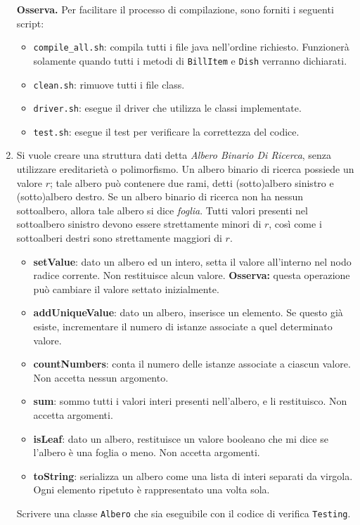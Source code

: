 \documentclass[]{scrartcl}
\begin{document}
\begin{enumerate}
\textbf{Osserva.} Per facilitare il processo di compilazione, sono forniti i seguenti script:
\begin{itemize}
	\item \texttt{compile\_all.sh}: compila tutti i file java nell'ordine richiesto. Funzionerà solamente quando tutti i metodi di \texttt{BillItem} e \texttt{Dish} verranno dichiarati.
	\item \texttt{clean.sh}: rimuove tutti i file class.
	\item \texttt{driver.sh}: esegue il driver che utilizza le classi implementate.
	\item \texttt{test.sh}: esegue il test per verificare la correttezza del codice.
\end{itemize}

\item Si vuole creare una struttura dati detta \textit{Albero Binario Di Ricerca}, senza utilizzare ereditarietà o polimorfismo. Un albero binario di ricerca possiede un valore $r$; tale albero può contenere due rami, detti (sotto)albero sinistro e (sotto)albero destro. Se un albero binario di ricerca non ha nessun sottoalbero, allora tale albero si dice \textit{foglia}. Tutti valori presenti nel sottoalbero sinistro devono essere strettamente minori di $r$, così come i sottoalberi destri sono strettamente maggiori di $r$.

\begin{itemize}
	\item \textbf{setValue}: dato un albero ed un intero, setta il valore all'interno nel nodo radice corrente. Non restituisce alcun valore. \textbf{Osserva:} questa operazione può cambiare il valore settato inizialmente.
	\item \textbf{addUniqueValue}: dato un albero, inserisce un elemento. Se questo già esiste, incrementare il numero di istanze associate a quel determinato valore.
	\item \textbf{countNumbers}: conta il numero delle istanze associate a ciascun valore. Non accetta nessun argomento.
	\item \textbf{sum}: sommo tutti i valori interi presenti nell'albero, e li restituisco. Non accetta argomenti.
	\item \textbf{isLeaf}: dato un albero, restituisce un valore booleano che mi dice se l'albero è una foglia o meno. Non accetta argomenti.
	\item \textbf{toString}: serializza un albero come una lista di interi separati da virgola. Ogni elemento ripetuto è rappresentato una volta sola.
\end{itemize}
Scrivere una classe \texttt{Albero} che sia eseguibile con il codice di verifica \texttt{Testing}.

	

	


\end{enumerate}
\end{document}
